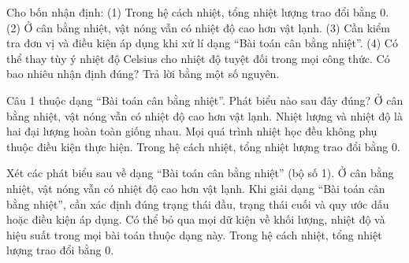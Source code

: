 \begin{ex}
Cho bốn nhận định: (1) Trong hệ cách nhiệt, tổng nhiệt lượng trao đổi bằng 0. (2) Ở cân bằng nhiệt, vật nóng vẫn có nhiệt độ cao hơn vật lạnh. (3) Cần kiểm tra đơn vị và điều kiện áp dụng khi xử lí dạng “Bài toán cân bằng nhiệt”. (4) Có thể thay tùy ý nhiệt độ Celsius cho nhiệt độ tuyệt đối trong mọi công thức. Có bao nhiêu nhận định đúng? Trả lời bằng một số nguyên.
\end{ex}

\begin{ex}
Câu 1 thuộc dạng “Bài toán cân bằng nhiệt”. Phát biểu nào sau đây đúng?
\choice
{Ở cân bằng nhiệt, vật nóng vẫn có nhiệt độ cao hơn vật lạnh.}
{Nhiệt lượng và nhiệt độ là hai đại lượng hoàn toàn giống nhau.}
{Mọi quá trình nhiệt học đều không phụ thuộc điều kiện thực hiện.}
{\True Trong hệ cách nhiệt, tổng nhiệt lượng trao đổi bằng 0.}
\end{ex}

\begin{ex}
Xét các phát biểu sau về dạng “Bài toán cân bằng nhiệt” (bộ số 1).
\choiceTF
{Ở cân bằng nhiệt, vật nóng vẫn có nhiệt độ cao hơn vật lạnh.}
{\True Khi giải dạng “Bài toán cân bằng nhiệt”, cần xác định đúng trạng thái đầu, trạng thái cuối và quy ước dấu hoặc điều kiện áp dụng.}
{Có thể bỏ qua mọi dữ kiện về khối lượng, nhiệt độ và hiệu suất trong mọi bài toán thuộc dạng này.}
{\True Trong hệ cách nhiệt, tổng nhiệt lượng trao đổi bằng 0.}
\end{ex}

